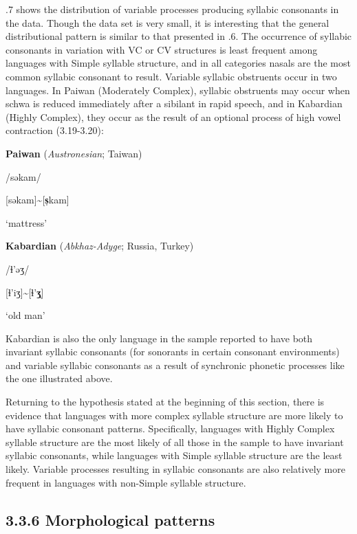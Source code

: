   .7 shows the distribution of variable processes producing syllabic consonants in the data. Though the data set is very small, it is interesting that the general distributional pattern is similar to that presented in .6. The occurrence of syllabic consonants in variation with VC or CV structures is least frequent among languages with Simple syllable structure, and in all categories nasals are the most common syllabic consonant to result. Variable syllabic obstruents occur in two languages. In Paiwan (Moderately Complex), syllabic obstruents may occur when schwa is reduced immediately after a sibilant in rapid speech, and in Kabardian (Highly Complex), they occur as the result of an optional process of high vowel contraction (3.19-3.20):

\ea\label{ex:(3.19)}
  \textbf{Paiwan} (\textit{Austronesian}; Taiwan)

/səkam/

[səkam]{\textasciitilde}[\textbf{s̩}kam]

‘mattress’

\citep[41]{Chang2006}

\z

\ea\label{ex:(3.20)}
  \textbf{Kabardian} (\textit{Abkhaz-Adyge}; Russia, Turkey)

/ɬ{}'əʒ/

[ɬ’iʒ]{\textasciitilde}[ɬ{}'\textbf{ʒ̩}]

‘old man’

\citep[24]{Kuipers1960}

\z

Kabardian is also the only language in the sample reported to have both invariant syllabic consonants (for sonorants in certain consonant environments) and variable syllabic consonants as a result of synchronic phonetic processes like the one illustrated above.

  Returning to the hypothesis stated at the beginning of this section, there is evidence that languages with more complex syllable structure are more likely to have syllabic consonant patterns. Specifically, languages with Highly Complex syllable structure are the most likely of all those in the sample to have invariant syllabic consonants, while languages with Simple syllable structure are the least likely. Variable processes resulting in syllabic consonants are also relatively more frequent in languages with non-Simple syllable structure.

\subsection{3.3.6 Morphological patterns}

